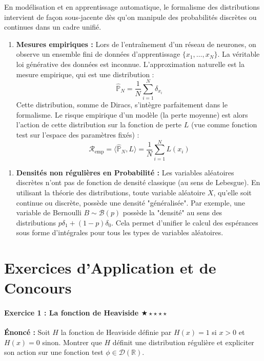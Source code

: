 \documentclass[11pt,a4paper]{article}
\begin{document}
En modélisation et en apprentissage automatique, le formalisme des distributions intervient de façon sous-jacente dès qu'on manipule des probabilités discrètes ou continues dans un cadre unifié.

\begin{enumerate}
\item \textbf{Mesures empiriques :}
Lors de l'entraînement d'un réseau de neurones, on observe un ensemble fini de données d'apprentissage $\{x_1, \dots, x_N\}$. La véritable loi générative des données est inconnue. L'approximation naturelle est la mesure empirique, qui est une distribution :
$$ \hat{\mathbb{P}}_N = \frac{1}{N} \sum_{i=1}^N \delta_{x_i} $$
Cette distribution, somme de Diracs, s'intègre parfaitement dans le formalisme. Le risque empirique d'un modèle (la perte moyenne) est alors l'action de cette distribution sur la fonction de perte $L$ (vue comme fonction test sur l'espace des paramètres fixés) :
$$ \mathcal{R}_{\text{emp}} = \langle \hat{\mathbb{P}}_N, L \rangle = \frac{1}{N} \sum_{i=1}^N L(x_i) $$
\end{enumerate}

\begin{enumerate}
\item \textbf{Densités non régulières en Probabilité :}
Les variables aléatoires discrètes n'ont pas de fonction de densité classique (au sens de Lebesgue). En utilisant la théorie des distributions, toute variable aléatoire $X$, qu'elle soit continue ou discrète, possède une densité "généralisée". Par exemple, une variable de Bernoulli $B \sim \mathcal{B}(p)$ possède la "densité" au sens des distributions $p \delta_1 + (1-p) \delta_0$. Cela permet d'unifier le calcul des espérances sous forme d'intégrales pour tous les types de variables aléatoires.
\end{enumerate}



\newpage
\part{Exercices d'Application et de Concours}


\subsection*{Exercice 1 : La fonction de Heaviside \quad $\bigstar\star\star\star\star$}

\textbf{Énoncé :}
Soit $H$ la fonction de Heaviside définie par $H(x) = 1$ si $x > 0$ et $H(x) = 0$ sinon. Montrer que $H$ définit une distribution régulière et expliciter son action sur une fonction test $\phi \in \mathcal{D}(\mathbb{R})$.
\end{document}
